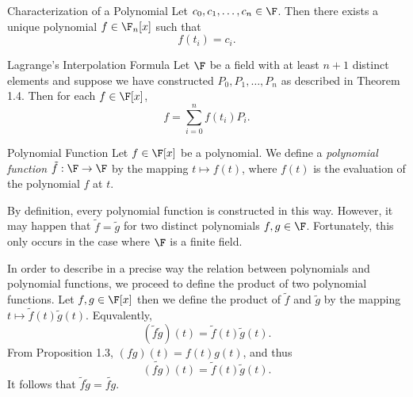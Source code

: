 \documentclass[math_245.tex]{subfiles}
\begin{document}
    \clearpage

    \begin{cor}{Characterization of a Polynomial}
        Let $c_0, c_1, \ldots, c_n\in \F$. Then there exists a unique polynomial $f\in \F_n[x]$ such that
        \begin{equation*}
            f(t_i) = c_i.
        \end{equation*}
    \end{cor}	

    \begin{cor}{Lagrange's Interpolation Formula}
        Let $\F$ be a field with at least $n+1$ distinct elements and suppose we have constructed $P_0, P_1, \ldots, P_n$ as described in Theorem 1.4. Then for each $f\in \F[x]$,
        \begin{equation*}
            f = \sum^{n}_{i=0} f(t_i)P_i.
        \end{equation*}
    \end{cor}	

    \begin{definition}{Polynomial Function}{}
        Let $f\in \F[x]$ be a polynomial. We define a \emph{polynomial function} $\tilde{f}:\F\to\F$ by the mapping $t\mapsto f(t)$, where $f(t)$ is the evaluation of the polynomial $f$ at $t$.
    \end{definition}

    \begin{remark}
        By definition, every polynomial function is constructed in this way. However, it may happen that $\tilde{f}=\tilde{g}$ for two distinct polynomials $f,g\in \F$. Fortunately, this only occurs in the case where $\F$ is a finite field.
    \end{remark}

    \begin{remark}
        In order to describe in a precise way the relation between polynomials and polynomial functions, we proceed to define the product of two polynomial functions. Let $f,g\in\F[x]$ then we define the product of $\tilde{f}$ and $\tilde{g}$ by the mapping $t\mapsto \tilde{f}(t)\tilde{g}(t)$. Equvalently,
        \begin{equation*}
            \left( \tilde{f}\tilde{g} \right)(t) = \tilde{f}(t)\tilde{g}(t).
        \end{equation*}
        From Proposition 1.3, $(fg)(t) = f(t)g(t)$, and thus
        \begin{equation*}
            \widetilde{(fg)}(t) = \tilde{f}(t)\tilde{g}(t).
        \end{equation*}
        It follows that $\tilde{f}\tilde{g} = \widetilde{fg}$.
    \end{remark}
\end{document}
